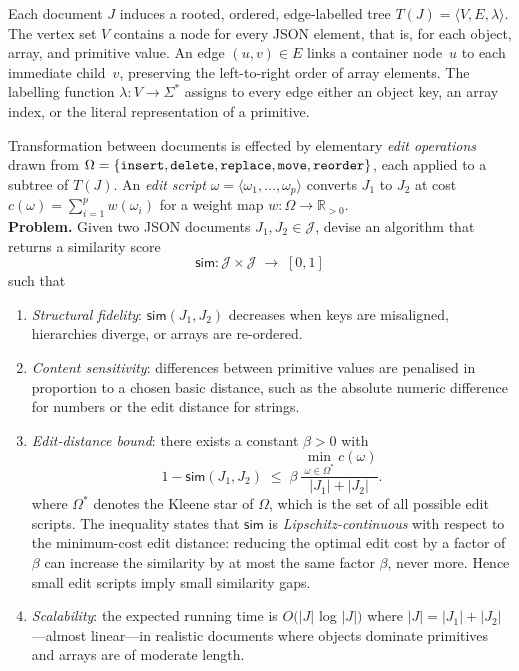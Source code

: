 \documentclass[sigconf]{acmart}
\begin{document}
Each document $J$ induces a rooted, ordered, edge-labelled tree $T(J)=\langle V,E,\lambda\rangle$.  
The vertex set $V$ contains a node for every JSON element, that is, for each object, array, and primitive value. An edge $(u,v)\in E$ links a container node~$u$ to each immediate child~$v$, preserving the left-to-right order of array elements.  
The labelling function $\lambda\!:\!V\rightarrow\Sigma^{*}$ assigns to every edge either an object key, an array index, or the literal representation of a primitive.

Transformation between documents is effected by elementary \emph{edit operations} drawn from  
$\Omega=\{\texttt{insert},\texttt{delete},\texttt{replace},\texttt{move},\\\texttt{reorder}\}$,  
each applied to a subtree of $T(J)$.  
An \emph{edit script} $\omega=\langle\omega_{1},\dots,\omega_{p}\rangle$ converts $J_{1}$ to $J_{2}$ at cost  
$c(\omega)=\sum_{i=1}^{p}w(\omega_{i})$ for a weight map $w:\Omega\to\mathbb{R}_{>0}$.\\

\textbf{Problem.}  
Given two JSON documents $J_{1},J_{2}\in\mathcal{J}$, devise an algorithm that returns a similarity score
\[
  \mathsf{sim} : \mathcal{J}\times\mathcal{J}\;\longrightarrow\;[0,1]
\]
such that

\begin{enumerate}[label=(\roman*)]
  \item \emph{Structural fidelity}: $\mathsf{sim}(J_{1},J_{2})$ decreases when keys are misaligned, hierarchies diverge, or arrays are re-ordered.
  \item \emph{Content sensitivity}: differences between primitive values are penalised in proportion to a chosen basic distance, such as the absolute numeric difference for numbers or the edit distance for strings.
  \item \emph{Edit-distance bound}: there exists a constant $\beta>0$ with
        \[
          1-\mathsf{sim}(J_{1},J_{2})
          \;\le\;
          \beta\,
          \frac{\displaystyle\min_{\omega\in\Omega^{*}}c(\omega)}
               {\lvert J_{1}\rvert+\lvert J_{2}\rvert}.
        \]
        where $\Omega^{*}$ denotes the Kleene star of $\Omega$, which is the set of all possible edit scripts. The inequality states that $\mathsf{sim}$ is \textit{Lipschitz-continuous}
        with respect to the minimum-cost edit distance:  
        reducing the optimal edit cost by a factor of $\beta$ can increase the similarity by at most the same factor $\beta$, never more.  Hence small edit scripts imply small similarity gaps.
  \item \emph{Scalability}: the expected running time is $O(\lvert J \rvert$ log $\lvert J \rvert)$ where $\lvert J \rvert = \lvert J_{1}\rvert+\lvert J_{2}\rvert$—almost linear—in realistic documents where objects dominate primitives and arrays are of moderate length.
\end{enumerate}
\end{document}
